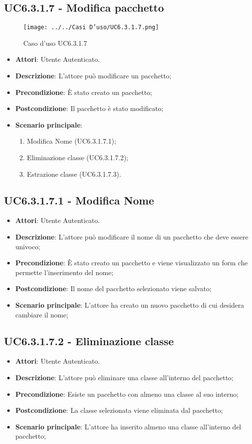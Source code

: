 \subsection{UC6.3.1.7 - Modifica pacchetto} 
\label{ssec:UC6.3.1.7} 
\begin{figure}[h!] 
\centering 
\texttt{[image: ../../Casi D'uso/UC6.3.1.7.png]} 
\caption{Caso d'uso UC6.3.1.7} 
 \end{figure} 
\begin{itemize} 
\item \textbf{Attori}: Utente Autenticato.
\item \textbf{Descrizione}: L'attore può modificare un pacchetto;
\item \textbf{Precondizione}: È stato creato un pacchetto;
\item \textbf{Postcondizione}: Il pacchetto è stato modificato;
\item \textbf{Scenario principale}: \begin{enumerate}\item Modifica Nome (UC6.3.1.7.1);\item Eliminazione classe (UC6.3.1.7.2);\item Estrazione classe (UC6.3.1.7.3). 
 \end{enumerate}
\end{itemize} 
\subsection{UC6.3.1.7.1 - Modifica Nome} 
\label{ssec:UC6.3.1.7.1} 
\begin{itemize} 
\item \textbf{Attori}: Utente Autenticato.
\item \textbf{Descrizione}: L'attore può modificare il nome di un pacchetto che deve essere univoco;
\item \textbf{Precondizione}: È stato creato un pacchetto e viene visualizzato un form che permette l'inserimento del nome;
\item \textbf{Postcondizione}: Il nome del pacchetto selezionato viene salvato;
\item \textbf{Scenario principale}: L'attore ha creato un nuovo pacchetto di cui desidera cambiare il nome;\end{itemize} 
\subsection{UC6.3.1.7.2 - Eliminazione classe} 
\label{ssec:UC6.3.1.7.2} 
\begin{itemize} 
\item \textbf{Attori}: Utente Autenticato.
\item \textbf{Descrizione}: L'attore può eliminare una classe all'interno del pacchetto;
\item \textbf{Precondizione}: Esiste un pacchetto con almeno una classe al suo interno;
\item \textbf{Postcondizione}: La classe selezionata viene eliminata dal pacchetto;
\item \textbf{Scenario principale}: L'attore ha inserito almeno una classe all'interno del pacchetto;\end{itemize} 
